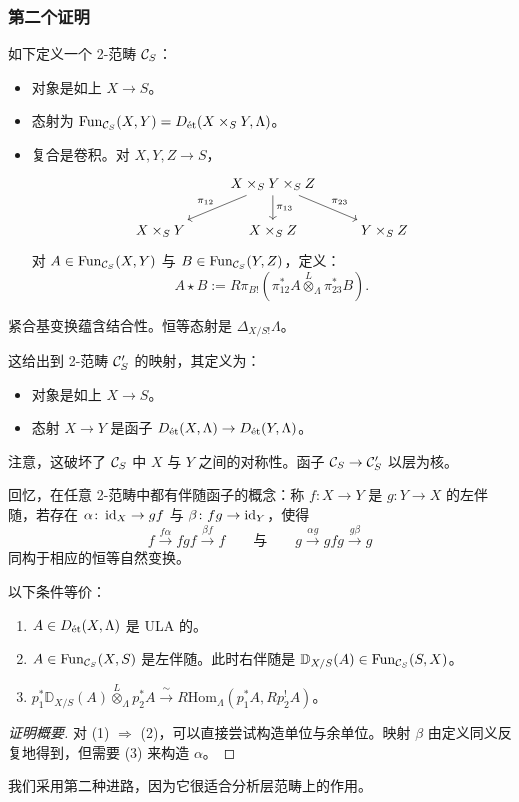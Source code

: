 \subsubsection{第二个证明}

如下定义一个 2-范畴 $\cC_S$：
\begin{itemize}
\item 对象是如上 $X\to S$。
\item 态射为 $\mathrm{Fun}_{\cC_S}(X,Y)=D_{\et}(X\times_S Y,\Lambda)$。
\item 复合是卷积。对 $X,Y,Z\to S$，
\[
\begin{tikzcd}
& X\times_S Y\times_S Z \arrow[dl, "\pi_{12}"'] \arrow[d, "\pi_{13}"] \arrow[dr, "\pi_{23}"] & \\
X\times_S Y & X\times_S Z & Y\times_S Z
\end{tikzcd}
\]
对 $A\in\mathrm{Fun}_{\cC_S}(X,Y)$ 与 $B\in\mathrm{Fun}_{\cC_S}(Y,Z)$，定义：
\[
A\star B:=R\pi_{B!}(\pi_{12}^*A\overset{L}{\otimes}_\Lambda\pi_{23}^*B).
\]
\end{itemize}

紧合基变换蕴含结合性。恒等态射是 $\Delta_{X/S!}\Lambda$。

这给出到 2-范畴 $\cC'_S$ 的映射，其定义为：
\begin{itemize}
\item 对象是如上 $X\to S$。
\item 态射 $X\to Y$ 是函子 $D_{\et}(X,\Lambda)\to D_{\et}(Y,\Lambda)$。
\end{itemize}

注意，这破坏了 $\cC_S$ 中 $X$ 与 $Y$ 之间的对称性。函子 $\cC_S\to\cC'_S$ 以层为核。

回忆，在任意 2-范畴中都有伴随函子的概念：称 $f\colon X\to Y$ 是 $g\colon Y\to X$ 的左伴随，若存在 $\alpha\colon\id_X\to gf$ 与 $\beta\colon fg\to\id_Y$，使得
\[
f\xrightarrow{f\alpha}fgf\xrightarrow{\beta f}f
\qquad\text{与}\qquad
g\xrightarrow{\alpha g}gfg\xrightarrow{g\beta}g
\]
同构于相应的恒等自然变换。

\begin{theorem}
以下条件等价：
\begin{enumerate}[label=(\arabic*)]
\item $A\in D_{\et}(X,\Lambda)$ 是 ULA 的。
\item $A\in\mathrm{Fun}_{\cC_S}(X,S)$ 是左伴随。此时右伴随是 $\mathbb{D}_{X/S}(A)\in\mathrm{Fun}_{\cC_S}(S,X)$。
\item $p_1^*\mathbb{D}_{X/S}(A)\overset{L}{\otimes}_\Lambda p_2^*A\xrightarrow{\ \sim\ }R\mathrm{Hom}_\Lambda(p_1^*A,Rp_2^!A)$。
\end{enumerate}
\end{theorem}

\begin{proof}[证明概要]
对 (1) $\Rightarrow$ (2)，可以直接尝试构造单位与余单位。映射 $\beta$ 由定义同义反复地得到，但需要 (3) 来构造 $\alpha$。
\end{proof}

我们采用第二种进路，因为它很适合分析层范畴上的作用。

